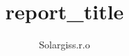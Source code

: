 \title{ {{report_title}} }
\author{\textenglish{Solargis\texttrademark  s.r.o}}

\maketitle
\thispagestyle{empty}

\newpage
\setcounter{page}{1}

